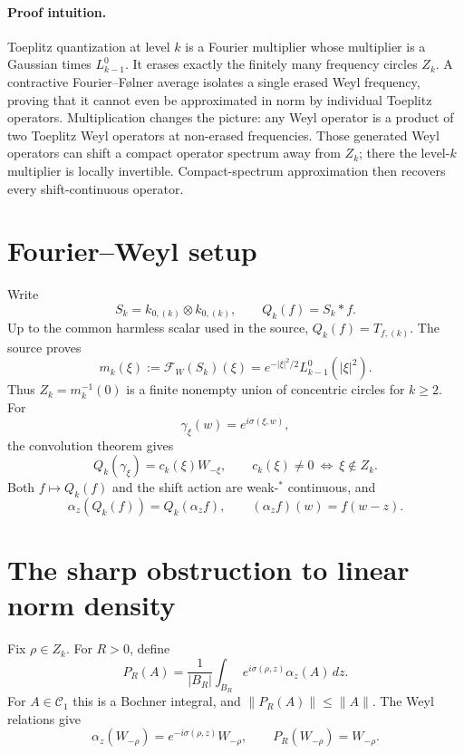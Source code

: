 \documentclass[10pt]{article}
\newcommand{\cC}{\mathcal C}
\newcommand{\cF}{\mathcal F}
\begin{document}
\paragraph{Proof intuition.}
Toeplitz quantization at level \(k\) is a Fourier multiplier whose multiplier is a Gaussian times \(L^0_{k-1}\). It erases exactly the finitely many frequency circles \(Z_k\). A contractive Fourier--Følner average isolates a single erased Weyl frequency, proving that it cannot even be approximated in norm by individual Toeplitz operators. Multiplication changes the picture: any Weyl operator is a product of two Toeplitz Weyl operators at non-erased frequencies. Those generated Weyl operators can shift a compact operator spectrum away from \(Z_k\); there the level-\(k\) multiplier is locally invertible. Compact-spectrum approximation then recovers every shift-continuous operator.

\section*{Fourier--Weyl setup}

Write
\[
 S_k=k_{0,(k)}\otimes k_{0,(k)},\qquad Q_k(f)=S_k*f.
\]
Up to the common harmless scalar used in the source, \(Q_k(f)=T_{f,(k)}\). The source proves \cite[Proposition 3.2 and (3.7)]{FH}
\begin{equation}\label{eq:mult}
 m_k(\xi):=\cF_W(S_k)(\xi)
 =e^{-|\xi|^2/2}L^0_{k-1}(|\xi|^2).
\end{equation}
Thus \(Z_k=m_k^{-1}(0)\) is a finite nonempty union of concentric circles for \(k\geq2\). For
\[
 \gamma_\xi(w)=e^{i\sigma(\xi,w)},
\]
the convolution theorem gives \cite[Remark 6]{FH}
\begin{equation}\label{eq:char}
 Q_k(\gamma_\xi)=c_k(\xi)W_{-\xi},
 \qquad c_k(\xi)\neq0\ \Longleftrightarrow\ \xi\notin Z_k.
\end{equation}
Both \(f\mapsto Q_k(f)\) and the shift action are weak-\(^*\) continuous, and
\begin{equation}\label{eq:cov}
 \alpha_z(Q_k(f))=Q_k(\alpha_z f),
 \qquad(\alpha_z f)(w)=f(w-z).
\end{equation}

\section*{The sharp obstruction to linear norm density}

Fix \(\rho\in Z_k\). For \(R>0\), define
\[
 P_R(A)=\frac1{|B_R|}\int_{B_R}
 e^{i\sigma(\rho,z)}\alpha_z(A)\,dz .
\]
For \(A\in\cC_1\) this is a Bochner integral, and \(\|P_R(A)\|\leq\|A\|\).
The Weyl relations give
\[
 \alpha_z(W_{-\rho})=e^{-i\sigma(\rho,z)}W_{-\rho},
 \qquad P_R(W_{-\rho})=W_{-\rho}.
\]
\end{document}
